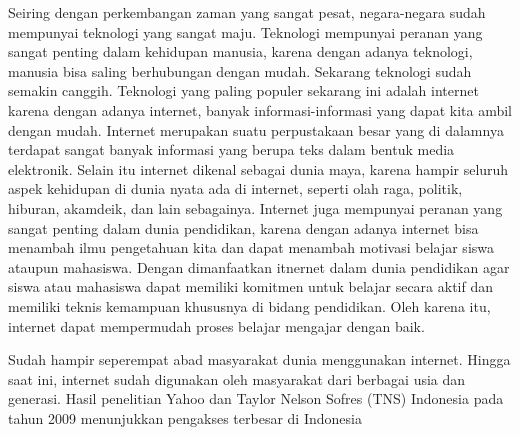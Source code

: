 \begin{abstrak}
Seiring dengan perkembangan zaman yang sangat pesat, negara-negara sudah mempunyai teknologi yang sangat maju. Teknologi mempunyai peranan yang sangat penting dalam kehidupan manusia, karena dengan adanya teknologi, manusia bisa saling berhubungan dengan mudah. Sekarang teknologi sudah semakin canggih. Teknologi yang paling populer sekarang ini adalah internet karena dengan adanya internet, banyak informasi-informasi yang dapat kita ambil dengan mudah. Internet merupakan suatu perpustakaan besar yang di dalamnya terdapat sangat banyak informasi yang berupa teks dalam bentuk media elektronik. Selain itu internet dikenal sebagai dunia maya, karena hampir seluruh aspek kehidupan di dunia nyata ada di internet, seperti olah raga, politik, hiburan, akamdeik, dan lain sebagainya. Internet juga mempunyai peranan yang sangat penting dalam dunia pendidikan, karena dengan adanya internet bisa menambah ilmu pengetahuan kita dan dapat menambah motivasi belajar siswa ataupun mahasiswa. Dengan dimanfaatkan itnernet dalam dunia pendidikan agar siswa atau mahasiswa dapat memiliki komitmen untuk belajar secara aktif dan memiliki teknis kemampuan khususnya di bidang pendidikan. Oleh karena itu, internet dapat mempermudah proses belajar mengajar dengan baik.
	
Sudah hampir seperempat abad masyarakat dunia menggunakan internet. Hingga saat ini, internet sudah digunakan oleh masyarakat dari berbagai usia dan generasi. Hasil penelitian Yahoo dan Taylor Nelson Sofres (TNS) Indonesia pada tahun 2009 menunjukkan pengakses terbesar di Indonesia 


\end{abstrak}
